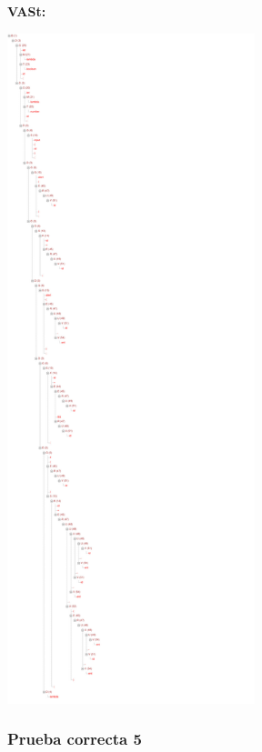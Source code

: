 \documentclass[11pt, , a4paper, titlepage]{article}
\newenvironment{changemargin}[2]{%
\begin{list}{}{%
\setlength{\topsep}{0pt}%
\setlength{\leftmargin}{#1}%
\setlength{\rightmargin}{#2}%
\setlength{\listparindent}{\parindent}%
\setlength{\itemindent}{\parindent}%
\setlength{\parsep}{\parskip}%
}%
\item[]}{\end{list}}
\begin{document}
\begin{changemargin}{+0.5cm}{+0cm}
    \textbf{VASt:}
    \vspace{1mm}
    \begin{center}
        \includegraphics[width=0.54\textwidth]{./resources/test-cases/case-4/tree.jpg}
    \end{center}

\end{changemargin}
\clearpage

\subsubsection{Prueba correcta 5}
\end{document}
